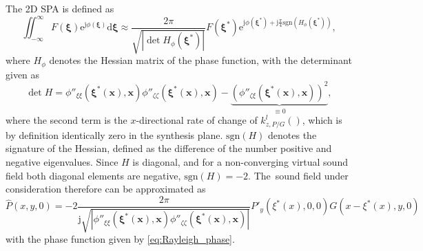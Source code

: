 \documentclass[12pt,a4paper]{article}
\newcommand{\td}{\mathrm{d}}
\newcommand{\te}{\mathrm{e}}
\newcommand{\ti}{\mathrm{j}}
\newcommand{\vx}{\mathbf{x}}
\newcommand{\vxi}{\bm{\xi}}
\begin{document}
The 2D SPA is defined as
%
\begin{equation}
\iint_{-\infty}^{\infty} F(\vxi) \te^{\ti \phi(\vxi)}\td \vxi \approx
\frac{2\pi}{\sqrt{|\det H_{\phi}(\vxi^*)|}}F(\vxi^*) \te^{\ti \phi (\vxi^*) + \ti \frac{\pi}{4} \text{sgn} (H_{\phi}(\vxi^*))},
\end{equation}
%
where $H_{\phi}$ denotes the Hessian matrix of the phase function, with the determinant given as
%
\begin{equation}
\det H = \phi''_{\xi\xi}(\vxi^*(\vx),\vx) \phi''_{\zeta\zeta}(\vxi^*(\vx),\vx) - \underbrace{\left( \phi''_{\zeta\xi}(\vxi^*(\vx),\vx) \right)^2}_{ \equiv 0},
\end{equation}
%
where the second term is the $x$-directional rate of change of $k^l_{z,P/G}()$, which is by definition identically zero in the synthesis plane.
$\text{sgn}(H)$ denotes the signature of the Hessian, defined as the difference of the number positive and negative eigenvalues. 
Since $H$ is diagonal, and for a non-converging virtual sound field both diagonal elements are negative, $\text{sgn} (H) = -2$.
The~sound field under consideration therefore can be approximated as
%
\begin{equation}
\hat{P}(x,y,0) =  -2 \frac{2\pi}{\ti \sqrt{|\phi''_{\xi\xi}(\vxi^*(\vx),\vx) \phi''_{\zeta\zeta}(\vxi^*(\vx),\vx)|}} P'_y(\xi^*(x),0,0) G(x-\xi^*(x),y,0)
\label{eq:Rayleigh_SPA}
\end{equation}
%
with the phase function given by \eqref{eq:Rayleigh_phase}.
\end{document}
